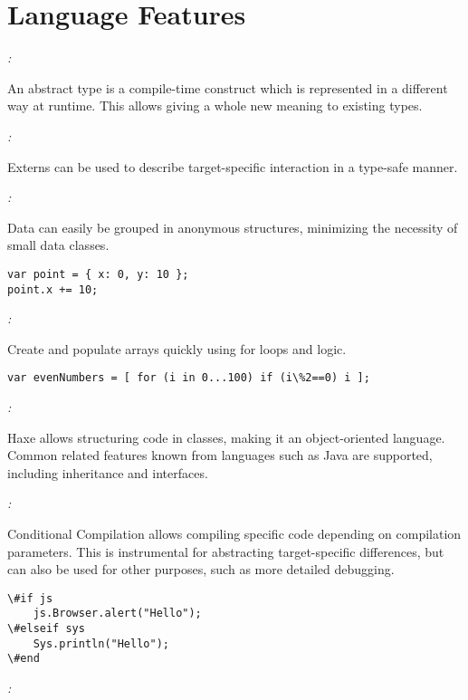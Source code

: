 \chapter{Language Features}
\label{lf}

\emph{:}

An abstract type is a compile-time construct which is represented in a different way at runtime. This allows giving a whole new meaning to existing types.

\emph{:}

Externs can be used to describe target-specific interaction in a type-safe manner.

\emph{:}

Data can easily be grouped in anonymous structures, minimizing the necessity of small data classes.

\begin{lstlisting}
var point = { x: 0, y: 10 };
point.x += 10;
\end{lstlisting}

\emph{:}

Create and populate arrays quickly using for loops and logic.

\begin{lstlisting}
var evenNumbers = [ for (i in 0...100) if (i\%2==0) i ];
\end{lstlisting}

\emph{:}

Haxe allows structuring code in classes, making it an object-oriented language. Common related features known from languages such as Java are supported, including inheritance and interfaces.

\emph{:}

Conditional Compilation allows compiling specific code depending on compilation parameters. This is instrumental for abstracting target-specific differences, but can also be used for other purposes, such as more detailed debugging.

\begin{lstlisting}
\#if js
    js.Browser.alert("Hello");
\#elseif sys
    Sys.println("Hello");
\#end
\end{lstlisting}

\emph{:}

